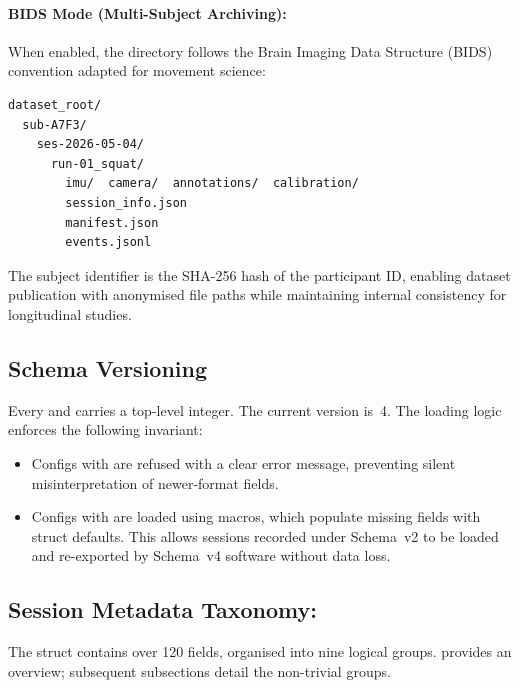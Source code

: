 \paragraph{BIDS Mode (Multi-Subject Archiving):}
When enabled, the directory follows the Brain Imaging Data Structure (BIDS) convention adapted for movement science:
\begin{lstlisting}[numbers=none, basicstyle=\ttfamily\footnotesize, frame=none, backgroundcolor=\color{white}]
dataset_root/
  sub-A7F3/
    ses-2026-05-04/
      run-01_squat/
        imu/  camera/  annotations/  calibration/
        session_info.json
        manifest.json
        events.jsonl
\end{lstlisting}

The subject identifier is the SHA-256 hash of the participant ID, enabling dataset publication with anonymised file paths while maintaining internal consistency for longitudinal studies.


\subsection{Schema Versioning}

Every  and  carries a top-level  integer.
The current version is~4.
The loading logic enforces the following invariant:
\begin{itemize}[nosep]
  \item Configs with  are refused with a clear error message, preventing silent misinterpretation of newer-format fields.
  \item Configs with  are loaded using  macros, which populate missing fields with struct defaults. This allows sessions recorded under Schema~v2 to be loaded and re-exported by Schema~v4 software without data loss.
\end{itemize}


\subsection{Session Metadata Taxonomy: }

The  struct contains over 120 fields, organised into nine logical groups.
 provides an overview; subsequent subsections detail the non-trivial groups.

